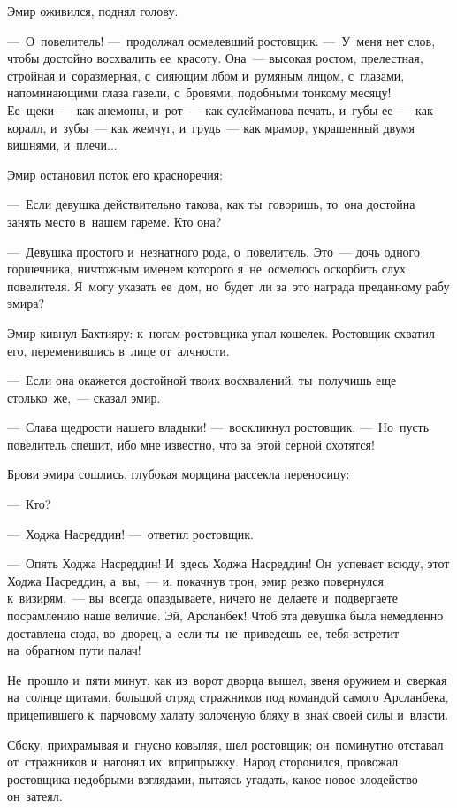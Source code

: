\documentclass[12pt,a4paper]{book}
\begin{document}
Эмир оживился, поднял голову.

—~О~повелитель! —~продолжал осмелевший ростовщик. —~У~меня нет слов, чтобы достойно восхвалить ее~красоту. Она~— высокая ростом, прелестная, стройная и~соразмерная, с~сияющим лбом и~румяным лицом, с~глазами, напоминающими глаза газели, с~бровями, подобными тонкому месяцу! Ее~щеки~— как анемоны, и~рот~— как сулейманова печать, и~губы ее~— как коралл, и~зубы~— как жемчуг, и~грудь~— как мрамор, украшенный двумя вишнями, и~плечи...

Эмир остановил поток его красноречия:

—~Если девушка действительно такова, как ты~говоришь, то~она достойна занять место в~нашем гареме. Кто она?

—~Девушка простого и~незнатного рода, о~повелитель. Это~— дочь одного горшечника, ничтожным именем которого я~не~осмелюсь оскорбить слух повелителя. Я~могу указать ее~дом, но~будет~ли за~это награда преданному рабу эмира?

Эмир кивнул Бахтияру: к~ногам ростовщика упал кошелек. Ростовщик схватил его, переменившись в~лице от~алчности.

—~Если она окажется достойной твоих восхвалений, ты~получишь еще столько~же,~— сказал эмир.

—~Слава щедрости нашего владыки! —~воскликнул ростовщик. —~Но~пусть повелитель спешит, ибо мне известно, что за~этой серной охотятся!

Брови эмира сошлись, глубокая морщина рассекла переносицу:

—~Кто?

—~Ходжа Насреддин! —~ответил ростовщик.

—~Опять Ходжа Насреддин! И~здесь Ходжа Насреддин! Он~успевает всюду, этот Ходжа Насреддин, а~вы,~— и, покачнув трон, эмир резко повернулся к~визирям,~— вы~всегда опаздываете, ничего не~делаете и~подвергаете посрамлению наше величие. Эй, Арсланбек! Чтоб эта девушка была немедленно доставлена сюда, во~дворец, а~если ты~не~приведешь~ее, тебя встретит на~обратном пути палач!

Не~прошло и~пяти минут, как из~ворот дворца вышел, звеня оружием и~сверкая на~солнце щитами, большой отряд стражников под командой самого Арсланбека, прицепившего к~парчовому халату золоченую бляху в~знак своей силы и~власти.

Сбоку, прихрамывая и~гнусно ковыляя, шел ростовщик; он~поминутно отставал от~стражников и~нагонял их~вприпрыжку. Народ сторонился, провожал ростовщика недобрыми взглядами, пытаясь угадать, какое новое злодейство он~затеял.
\end{document}
